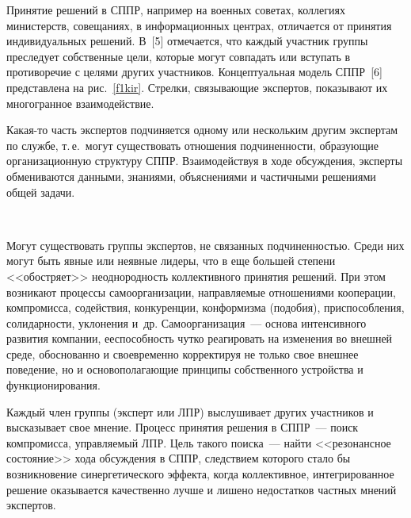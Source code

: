 \begin{multicols}{2}
  Принятие решений в СППР, например на военных советах, коллегиях 
министерств, совещаниях, в информационных центрах, отличается от принятия 
индивидуальных решений. В~[5] отмечается, что каждый участник группы 
преследует собственные цели, которые могут совпадать или вступать в 
противоречие с целями других участников. Концептуальная модель СППР~[6] 
представлена на рис.~\ref{f1kir}. Стрелки, связывающие экспертов, показывают 
их многогранное взаимодействие.
  
  Какая-то часть экспертов подчиняется одному или нескольким другим 
экспертам по службе, т.\,е.\ могут существовать отношения под\-чи\-нен\-ности, 
образующие организационную структуру \mbox{СППР}. Взаимодействуя в ходе 
обсуждения, эксперты обмениваются данными, знаниями, объяснениями и 
частичными решениями общей задачи.
  
\begin{figure*} %
\begin{center}
\vspace*{1pt}
\mbox{%
\epsfxsize=102.136mm
}
\end{center}
\vspace*{-12pt}
\vspace*{-3pt}
\end{figure*}
  
  Могут существовать группы экспертов, не связанных подчиненностью. 
Среди них могут быть явные или неявные лидеры, что в еще большей степени 
<<обостряет>> неоднородность коллективного принятия решений. При этом 
возникают процессы самоорганизации, направляемые отношениями\linebreak 
кооперации, компромисса, содействия, конкуренции, конформизма (подобия), 
приспособления, солидарности, уклонения и~др. Самоорганизация~--- основа 
интенсивного развития компании, ее\linebreak способность чутко реагировать на 
изменения во внешней среде, обоснованно и своевременно корректируя не 
только свое внешнее поведение, но и основополагающие принципы 
собственного устройства и функционирования.
  
  Каждый член группы (эксперт или ЛПР) выслушивает других участников и 
высказывает свое мнение. Процесс принятия решения в СППР~--- поиск 
компромисса, управляемый ЛПР. Цель такого поиска~--- найти <<резонансное 
состояние>> хода обсуждения в СППР, следствием которого стало бы 
возникновение синергетического эффекта, когда коллективное, 
интегрированное решение оказывается качественно лучше и лишено 
недостатков частных мнений экспертов.
  

\end{multicols}
